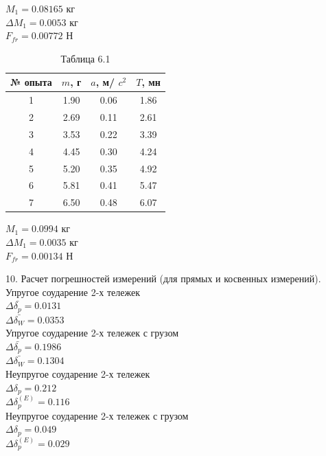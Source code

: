 \documentclass[12pt]{article}
\begin{document}
\begin{flushleft}
    $ M_1 = 0.08165 $ кг \\
    $ \Delta M_1 = 0.0053 $ кг \\
    $ F_{fr} = 0.00772 $ Н \\

    \begin{table}[h]
        \centering
        \renewcommand{\arraystretch}{1.3}
        \setlength{\tabcolsep}{8pt}
        \captionsetup{justification=centering, font=bf}
        \caption{Таблица 6.1}
        \begin{tabular}{|c|c|c|c|}
            \hline № опыта & \( m \), г & \( a \), м/ $c^2$ & \( T \), мн \\
            \hline 1 & 1.90 & 0.06 & 1.86 \\
            \hline 2 & 2.69 & 0.11 & 2.61 \\
            \hline 3 & 3.53 & 0.22 & 3.39 \\
            \hline 4 & 4.45 & 0.30 & 4.24 \\
            \hline 5 & 5.20 & 0.35 & 4.92 \\
            \hline 6 & 5.81 & 0.41 & 5.47 \\
            \hline 7 & 6.50 & 0.48 & 6.07 \\
            \hline
        \end{tabular}
    \end{table}

    $ M_1 = 0.0994 $ кг \\
    $ \Delta M_1 = 0.0035 $ кг \\
    $ F_{fr} = 0.00134 $ Н \\
\end{flushleft}

\begin{flushleft}
    10. Расчет погрешностей измерений (для прямых и косвенных измерений). \\
    Упругое соударение 2-х тележек \\
    $ \Delta \bar{\delta_p} = 0.0131 $ \\
    $ \Delta \bar{\delta_W} = 0.0353 $ \\
    Упругое соударение 2-х тележек с грузом \\
    $ \Delta \bar{\delta_p} = 0.1986 $ \\
    $ \Delta \bar{\delta_W} = 0.1304 $ \\
    Неупругое соударение 2-х тележек \\
    $ \Delta \delta_p = 0.212 $ \\
    $ \Delta \delta_p^{(E)} = 0.116 $ \\
    Неупругое соударение 2-х тележек с грузом \\
    $ \Delta \delta_p = 0.049 $ \\
    $ \Delta \delta_p^{(E)} = 0.029 $ \\
\end{flushleft}
\end{document}
